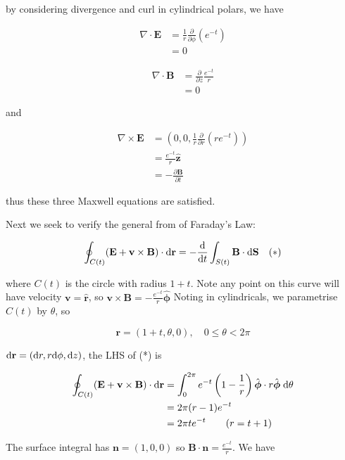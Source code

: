 \documentclass[a4paper]{article}
\begin{document}
by considering divergence and curl in cylindrical polars, we have

\begin{align*}
\nabla \cdot \mathbf{E} & =  \frac{1}{r} \frac{\partial }{\partial \phi} (e^{-t}) \\
& = 0
\end{align*}

\begin{align*}
\nabla \cdot \mathbf{B} & =  \frac{\partial }{\partial z} \frac{e^{-t}}{r} \\
& = 0
\end{align*}

and


\begin{align*}
\nabla \times \mathbf{E} & =  \left( 0,0,\frac{1}{r} \frac{\partial }{\partial r}  (r e^{-t}) \right) \\
& =  \frac{e^{-t}}{r} \hat{\mathbf{z}} \\
& = - \frac{\partial \mathbf{B} }{\partial t}
\end{align*}

thus these three Maxwell equations are satisfied. 

Next we seek to verify the general from of Faraday's Law:

\[ \oint_{C(t)} (\mathbf{E} + \mathbf{v}  \times \mathbf{B} ) \cdot \mathrm{d} \mathbf{r} = - \frac{\mathrm{d} }{\mathrm{d} t} \int_{S(t)} \mathbf{B} \cdot \mathrm{d} \mathbf{S} \quad (*)  \]

where $ C(t) $ is the circle with radius $ 1 + t $. Note any point on this curve will have velocity $ \mathbf{v} = \hat{\mathbf{r}} $, so $ \mathbf{v} \times \mathbf{B} = - \frac{e^{-t}}{r} \hat{\boldsymbol{\phi}} $ Noting in cylindricals, we parametrise $ C(t) $ by $ \theta $, so 


\[ \mathbf{r} = ( 1+t,\theta,0), \quad 0 \leq  \theta < 2 \pi \]

 $ \mathrm{d} \mathbf{r} = (\mathrm{d} r, r \mathrm{d} \phi, \mathrm{d} z) $, the LHS of (*) is 

\begin{align*}
\oint_{C(t)}  (\mathbf{E} + \mathbf{v}  \times \mathbf{B} ) \cdot \mathrm{d} \mathbf{r} & = \int_{0}^{2\pi}  e^{-t} \left( 1 - \frac{1}{r} \right) \hat{\boldsymbol{\phi}} \cdot r \hat{\boldsymbol{\phi}} \; \mathrm{d} \theta \\
	& =  2 \pi (r - 1) e^{-t} \\
	& = 2 \pi t e^{-t} \qquad (r = t + 1)
\end{align*}

The surface integral has $ \mathbf{n} = (1,0,0) $ so $ \mathbf{B} \cdot \mathbf{n} = \frac{e^{-t}}{r} $. We have
\end{document}
